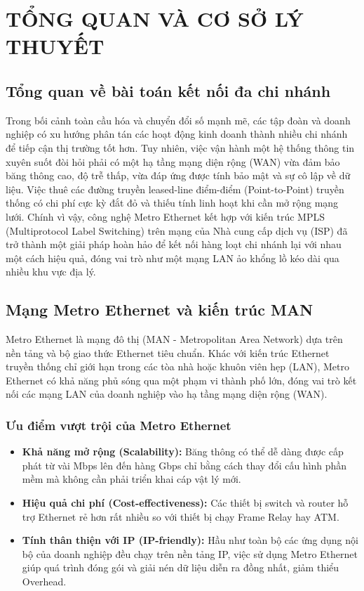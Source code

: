 \section{TỔNG QUAN VÀ CƠ SỞ LÝ THUYẾT}

\subsection{Tổng quan về bài toán kết nối đa chi nhánh}
Trong bối cảnh toàn cầu hóa và chuyển đổi số mạnh mẽ, các tập đoàn và doanh nghiệp có xu hướng phân tán các hoạt động kinh doanh thành nhiều chi nhánh để tiếp cận thị trường tốt hơn. Tuy nhiên, việc vận hành một hệ thống thông tin xuyên suốt đòi hỏi phải có một hạ tầng mạng diện rộng (WAN) vừa đảm bảo băng thông cao, độ trễ thấp, vừa đáp ứng được tính bảo mật và sự cô lập về dữ liệu. Việc thuê các đường truyền leased-line điểm-điểm (Point-to-Point) truyền thống có chi phí cực kỳ đắt đỏ và thiếu tính linh hoạt khi cần mở rộng mạng lưới. 
Chính vì vậy, công nghệ Metro Ethernet kết hợp với kiến trúc MPLS (Multiprotocol Label Switching) trên mạng của Nhà cung cấp dịch vụ (ISP) đã trở thành một giải pháp hoàn hảo để kết nối hàng loạt chi nhánh lại với nhau một cách hiệu quả, đóng vai trò như một mạng LAN ảo khổng lồ kéo dài qua nhiều khu vực địa lý.

\subsection{Mạng Metro Ethernet và kiến trúc MAN}
Metro Ethernet là mạng đô thị (MAN - Metropolitan Area Network) dựa trên nền tảng và bộ giao thức Ethernet tiêu chuẩn. Khác với kiến trúc Ethernet truyền thống chỉ giới hạn trong các tòa nhà hoặc khuôn viên hẹp (LAN), Metro Ethernet có khả năng phủ sóng qua một phạm vi thành phố lớn, đóng vai trò kết nối các mạng LAN của doanh nghiệp vào hạ tầng mạng diện rộng (WAN).

\subsubsection{Ưu điểm vượt trội của Metro Ethernet}
\begin{itemize}
    \item \textbf{Khả năng mở rộng (Scalability):} Băng thông có thể dễ dàng được cấp phát từ vài Mbps lên đến hàng Gbps chỉ bằng cách thay đổi cấu hình phần mềm mà không cần phải triển khai cáp vật lý mới.
    \item \textbf{Hiệu quả chi phí (Cost-effectiveness):} Các thiết bị switch và router hỗ trợ Ethernet rẻ hơn rất nhiều so với thiết bị chạy Frame Relay hay ATM.
    \item \textbf{Tính thân thiện với IP (IP-friendly):} Hầu như toàn bộ các ứng dụng nội bộ của doanh nghiệp đều chạy trên nền tảng IP, việc sử dụng Metro Ethernet giúp quá trình đóng gói và giải nén dữ liệu diễn ra đồng nhất, giảm thiểu Overhead.
\end{itemize}


